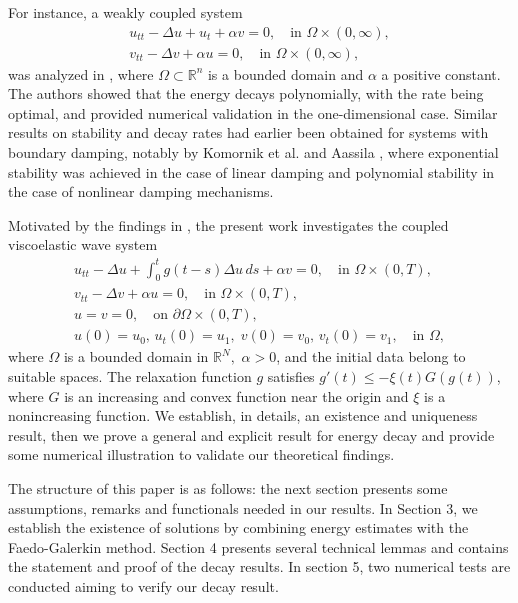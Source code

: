 For instance, a weakly coupled system
\begin{gather*}
u_{tt} - \Delta u + u_t + \alpha v = 0, \quad \text{in } \Omega \times (0, \infty), \\
v_{tt} - \Delta v + \alpha u = 0, \quad \text{in } \Omega \times (0, \infty),
\end{gather*}
was analyzed in \cite{LRF}, where $\Omega \subset \mathbb{R}^n$ is a bounded domain and
$\alpha$ a positive constant. The authors showed that the energy decays polynomially,
with the rate being optimal, and provided numerical validation in the one-dimensional case.
Similar results on stability and decay rates had earlier been obtained for systems with
boundary damping, notably by Komornik et al. \cite{KVBR} and Aassila \cite{Assila1, Assila2},
where exponential stability was achieved in the case of linear damping and polynomial stability
in the case of nonlinear damping mechanisms.

Motivated by the findings in \cite{GASM}, the present work investigates the coupled viscoelastic wave system
\begin{equation} \label{e1.1}
\begin{gathered}
u_{tt} - \Delta u + \int_0^t g(t - s) \Delta u \, ds + \alpha v = 0, \quad
 \text{in } \Omega \times (0, T), \\
v_{tt} - \Delta v + \alpha u = 0, \quad \text{in } \Omega \times (0, T), \\
u = v = 0, \quad \text{on } \partial \Omega \times (0, T), \\
u(0) = u_0, \, u_t(0) = u_1, \; v(0) = v_0, \, v_t(0) = v_1, \quad \text{in } \Omega,
\end{gathered}
\end{equation}
where \( \Omega \) is a bounded domain in \( \mathbb{R}^N, \) \( \alpha > 0 \), and the initial
data belong to suitable spaces. The relaxation function \( g \) satisfies
\( g'(t) \leq -\xi(t) G(g(t)) \), where $G$ is an increasing and convex function near the origin and
$\xi$ is a nonincreasing function. We establish, in details, an existence and uniqueness result,
then we prove a general and explicit result for energy decay and provide some numerical
illustration to validate our theoretical findings.

The structure of this paper is as follows: the next section presents some assumptions,
remarks and functionals needed in our results. In Section 3, we establish the existence of
solutions by combining energy estimates with the Faedo-Galerkin method.
Section 4 presents several technical lemmas and contains the statement and proof of the
decay results.
In section 5, two numerical tests are conducted aiming to verify our decay result.

